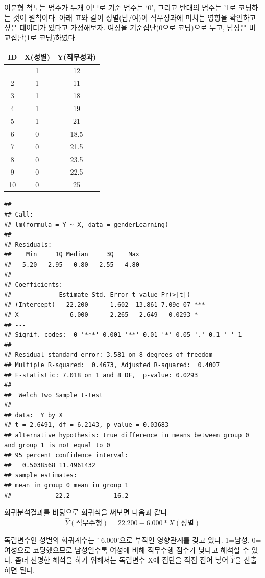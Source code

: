 \documentclass[
]{book}
\begin{document}
이분형 척도는 범주가 두개 이므로 기준 범주는 `0', 그리고 반대의 범주는 '1로 코딩하는 것이 원칙이다. 아래 표와 같이 성별(남/여)이 직무성과에 미치는 영향을 확인하고 싶은 데이터가 있다고 가정해보자. 여성을 기준집단(0으로 코딩)으로 두고, 남성은 비교집단(1로 코딩)하였다.

\begin{longtable}[]{@{}ccc@{}}
\toprule\noalign{}
ID & X(성별) & Y(직무성과) \\
\midrule\noalign{}
\endhead
\bottomrule\noalign{}
\endlastfoot
1 & 1 & 12 \\
2 & 1 & 11 \\
3 & 1 & 18 \\
4 & 1 & 19 \\
5 & 1 & 21 \\
6 & 0 & 18.5 \\
7 & 0 & 21.5 \\
8 & 0 & 23.5 \\
9 & 0 & 22.5 \\
10 & 0 & 25 \\
\end{longtable}

\begin{verbatim}
## 
## Call:
## lm(formula = Y ~ X, data = genderLearning)
## 
## Residuals:
##    Min     1Q Median     3Q    Max 
##  -5.20  -2.95   0.80   2.55   4.80 
## 
## Coefficients:
##             Estimate Std. Error t value Pr(>|t|)    
## (Intercept)   22.200      1.602  13.861 7.09e-07 ***
## X             -6.000      2.265  -2.649   0.0293 *  
## ---
## Signif. codes:  0 '***' 0.001 '**' 0.01 '*' 0.05 '.' 0.1 ' ' 1
## 
## Residual standard error: 3.581 on 8 degrees of freedom
## Multiple R-squared:  0.4673, Adjusted R-squared:  0.4007 
## F-statistic: 7.018 on 1 and 8 DF,  p-value: 0.0293
## 
##  Welch Two Sample t-test
## 
## data:  Y by X
## t = 2.6491, df = 6.2143, p-value = 0.03683
## alternative hypothesis: true difference in means between group 0 and group 1 is not equal to 0
## 95 percent confidence interval:
##   0.5038568 11.4961432
## sample estimates:
## mean in group 0 mean in group 1 
##            22.2            16.2
\end{verbatim}

회귀분석결과를 바탕으로 회귀식을 써보면 다음과 같다.
\[\hat{Y}(직무수행) = 22.200-6.000 \ast X(성별) \]

독립변수인 성별의 회귀계수는 '-6.000'으로 부적인 영향관계를 갖고 있다. 1=남성, 0=여성으로 코딩했으므로 남성일수록 여성에 비해 직무수행 점수가 낮다고 해석할 수 있다. 좀더 선명한 해석을 하기 위해서는 독립변수 X에 집단을 직접 집어 넣어 \(\hat{Y}\)을 산출하면 된다.
\end{document}
